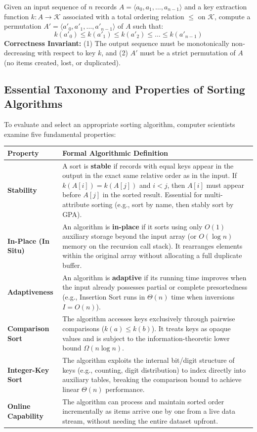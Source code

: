 \documentclass[11pt,a4paper]{article}
\begin{document}
\begin{definitionbox}
Given an input sequence of $n$ records $A = \langle a_0, a_1, \dots, a_{n-1} \rangle$ and a key extraction function $k: A \to \mathcal{K}$ associated with a total ordering relation $\le$ on $\mathcal{K}$, compute a permutation $A' = \langle a'_0, a'_1, \dots, a'_{n-1} \rangle$ of $A$ such that:
\[
k(a'_0) \le k(a'_1) \le k(a'_2) \le \dots \le k(a'_{n-1})
\]
\textbf{Correctness Invariant:} (1) The output sequence must be monotonically non-decreasing with respect to key $k$, and (2) $A'$ must be a strict permutation of $A$ (no items created, lost, or duplicated).
\end{definitionbox}

\subsection{Essential Taxonomy and Properties of Sorting Algorithms}
To evaluate and select an appropriate sorting algorithm, computer scientists examine five fundamental properties:

\begin{center}
\begin{tabularx}{\textwidth}{p{3.2cm} X}
\toprule
\textbf{Property} & \textbf{Formal Algorithmic Definition} \\
\midrule
\textbf{Stability} & A sort is \textbf{stable} if records with equal keys appear in the output in the exact same relative order as in the input. If $k(A[i]) = k(A[j])$ and $i < j$, then $A[i]$ must appear before $A[j]$ in the sorted result. Essential for multi-attribute sorting (e.g., sort by name, then stably sort by GPA). \\
\addlinespace
\textbf{In-Place (In Situ)} & An algorithm is \textbf{in-place} if it sorts using only $O(1)$ auxiliary storage beyond the input array (or $O(\log n)$ memory on the recursion call stack). It rearranges elements within the original array without allocating a full duplicate buffer. \\
\addlinespace
\textbf{Adaptiveness} & An algorithm is \textbf{adaptive} if its running time improves when the input already possesses partial or complete presortedness (e.g., Insertion Sort runs in $\Theta(n)$ time when inversions $I = O(n)$). \\
\addlinespace
\textbf{Comparison Sort} & The algorithm accesses keys exclusively through pairwise comparisons ($k(a) \le k(b)$). It treats keys as opaque values and is subject to the information-theoretic lower bound $\Omega(n \log n)$. \\
\addlinespace
\textbf{Integer-Key Sort} & The algorithm exploits the internal bit/digit structure of keys (e.g., counting, digit distribution) to index directly into auxiliary tables, breaking the comparison bound to achieve linear $\Theta(n)$ performance. \\
\addlinespace
\textbf{Online Capability} & The algorithm can process and maintain sorted order incrementally as items arrive one by one from a live data stream, without needing the entire dataset upfront. \\
\bottomrule
\end{tabularx}
\end{center}
\end{document}
